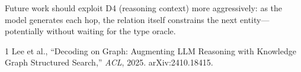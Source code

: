 \documentclass[11pt,a4paper]{article}
\begin{document}
Future work should exploit D4 (reasoning context) more aggressively:
as the model generates each hop, the relation itself constrains the
next entity---potentially without waiting for the type oracle.

\begin{thebibliography}{1}
  Lee et al., ``Decoding on Graph: Augmenting LLM Reasoning with
  Knowledge Graph Structured Search,'' \emph{ACL}, 2025.
  arXiv:2410.18415.
\end{thebibliography}
\end{document}
